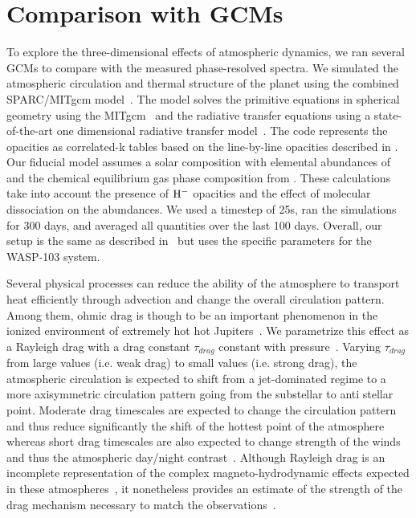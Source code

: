 \documentclass[twocolumn]{aastex61}
\begin{document}
\section{Comparison with GCMs}
\label{sec:gcm}
To explore the three-dimensional effects of atmospheric dynamics, we ran several GCMs to compare with the measured phase-resolved spectra.  We simulated the atmospheric circulation and thermal structure of the planet using the combined SPARC/MITgcm model~\citep{showman09}. The model solves the primitive equations in spherical geometry using the MITgcm~\citep{Adcroft2004} and the radiative transfer equations using a state-of-the-art one dimensional radiative transfer model~\citep{Marley1999}. The code represents the opacities as correlated-k tables based on the line-by-line opacities described in \citet{Visscher2006,freedman14}. Our fiducial model assumes a solar composition with elemental abundances of \citet{Lodders2002a} and the chemical equilibrium gas phase composition from \citet{Visscher2006}. These calculations take into account the presence of $\rm H^-$ opacities and the effect of molecular dissociation on the abundances. We used a timestep of 25s, ran the simulations for 300 days, and averaged all quantities over the last 100 days. Overall, our setup is the same as described in~\citet{parmentier16} but uses the specific parameters for the WASP-103 system.

Several physical processes can reduce the ability of the atmosphere to transport heat efficiently through advection and change the overall circulation pattern. Among them, ohmic drag is though to be an important phenomenon in the ionized environment of extremely hot hot Jupiters~\citep{perna10}. We parametrize this effect as a Rayleigh drag with a drag constant $\tau_{drag}$ constant with pressure~\citep{showman13}. Varying $\tau_{drag}$  from large values (i.e. weak drag) to small values (i.e. strong drag), the atmospheric circulation is expected to shift from a jet-dominated regime to a more axisymmetric circulation pattern going from the substellar to anti stellar point. Moderate drag timescales are expected to change the circulation pattern and thus reduce significantly the shift of the hottest point of the atmosphere whereas short drag timescales are also expected to change strength of the winds and thus the atmospheric day/night contrast~\citep{komacek16,komacek17}.  Although Rayleigh drag is an incomplete representation of the complex magneto-hydrodynamic effects expected in these atmospheres~\citep{batygin13,rogers14,rogers14a,rogers17}, it nonetheless provides an estimate of the strength of the drag mechanism necessary to match the observations~\citep{komacek17,koll18,parmentier17}. 
\end{document}
